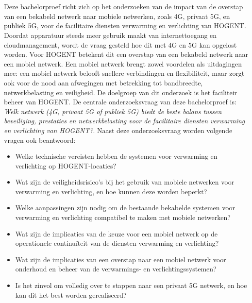 
\chapter{}%
\label{ch:inleiding}

Deze bachelorproef richt zich op het onderzoeken van de impact van de overstap van een bekabeld netwerk naar mobiele netwerken, zoals 4G, privaat 5G, en publiek 5G, voor de facilitaire diensten verwarming en verlichting van HOGENT. Doordat apparatuur steeds meer gebruik maakt van internettoegang en cloudmanagement, wordt de vraag gesteld hoe dit met 4G en 5G kan opgelost worden. Voor HOGENT betekent dit een overstap van een bekabeld netwerk naar een mobiel netwerk. Een mobiel netwerk brengt zowel voordelen als uitdagingen mee: een mobiel netwerk belooft snellere verbindingen en flexibiliteit, maar zorgt ook voor de nood aan afwegingen met betrekking tot bandbreedte, netwerkbelasting en veiligheid. De doelgroep van dit onderzoek is het faciliteir beheer van HOGENT. De centrale onderzoeksvraag van deze bachelorproef is: \textit{Welk netwerk (4G, privaat 5G of publiek 5G) biedt de beste balans tussen beveiliging, prestaties en netwerkbelasting voor de facilitaire diensten verwarming en verlichting van HOGENT?}. Naast deze onderzoeksvraag worden volgende vragen ook beantwoord: 
\begin{itemize}
    \item Welke technische vereisten hebben de systemen voor verwarming en verlichting op HOGENT-locaties?
    \item Wat zijn de veiligheidsrisico’s bij het gebruik van mobiele netwerken voor verwarming en verlichting, en hoe kunnen deze worden beperkt?
    \item Welke aanpassingen zijn nodig om de bestaande bekabelde systemen voor verwarming en verlichting compatibel te maken met mobiele netwerken?
    \item Wat zijn de implicaties van de keuze voor een mobiel netwerk op de operationele continuïteit van de diensten verwarming en verlichting?
    \item Wat zijn de implicaties van een overstap naar een mobiel netwerk voor onderhoud en beheer van de verwarmings- en verlichtingssystemen?
    \item Is het zinvol om volledig over te stappen naar een privaat 5G netwerk, en hoe kan dit het best worden gerealiseerd?
\end{itemize}
